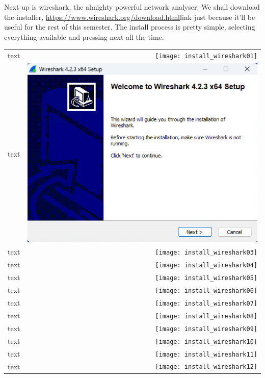 \documentclass[11pt,a4paper]{report}
\begin{document}
        Next up is wireshark, the almighty powerful network analyser.
        We shall download the installer, \url{https://www.wireshark.org/download.html}{link} just because it'll be useful for the rest of this semester.
        The install process is pretty simple, selecting everything available and pressing next all the time.
        \begin{tabular}{ l r }
            text & \texttt{[image: install\_wireshark01]} \\
            text & \includegraphics[scale=0.3]{install_wireshark02} \\
            text & \texttt{[image: install\_wireshark03]} \\
            text & \texttt{[image: install\_wireshark04]} \\
            text & \texttt{[image: install\_wireshark05]} \\
            text & \texttt{[image: install\_wireshark06]} \\
            text & \texttt{[image: install\_wireshark07]} \\
            text & \texttt{[image: install\_wireshark08]} \\
            text & \texttt{[image: install\_wireshark09]} \\
            text & \texttt{[image: install\_wireshark10]} \\
            text & \texttt{[image: install\_wireshark11]} \\
            text & \texttt{[image: install\_wireshark12]} \\

\end{tabular}
\end{document}
